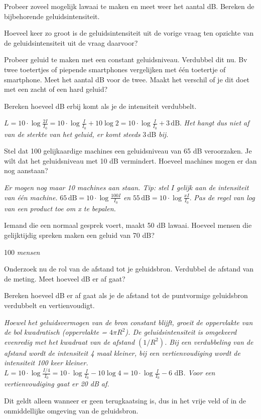 \begin{werktekstoef}
\setcounter{enumi}{13}
\item{Probeer zoveel mogelijk lawaai te maken en meet weer het aantal dB. Bereken de bijbehorende geluidsintensiteit.}

\item{Hoeveel keer zo groot is de geluidsintensiteit uit de vorige vraag ten opzichte van de geluidsintensiteit uit de vraag daarvoor?}

\item{Probeer geluid te maken met een constant geluidsniveau. Verdubbel dit nu. Bv twee toetertjes of piepende smartphones vergelijken met één toetertje of smartphone. Meet het aantal dB voor de twee. Maakt het verschil of je dit doet met een zacht of een hard geluid? }

\item{Bereken hoeveel dB erbij komt als je de intensiteit verdubbelt.}

$L=10\cdot\log\frac{2I}{I_0}=10\cdot\log\frac{I}{I_0}+10\log2=10\cdot\log\frac{I}{I_0}+3\,\textrm{dB}$. \emph{Het hangt dus niet af van de sterkte van het geluid, er komt steeds} 3\,dB \emph{bij.}

\item{Stel dat 100 gelijkaardige machines een geluidsniveau van 65 dB veroorzaken. Je wilt dat het geluidsniveau met 10 dB vermindert. Hoeveel machines mogen er dan nog aanstaan?}

\emph{Er mogen nog maar 10 machines aan staan. Tip: stel $I$ gelijk aan de intensiteit van één machine.} $65\,\textrm{dB}=10\cdot\log\frac{100I}{I_0}$ \emph{en} $55\,\textrm{dB}=10\cdot\log\frac{xI}{I_0}$. \emph{ Pas de regel van \textrm{log} van een product toe om x te bepalen.}

\item {Iemand die een normaal gesprek voert, maakt 50 dB lawaai. Hoeveel mensen die gelijktijdig spreken maken een geluid van 70 dB?}

100 \emph{ mensen}

\item {Onderzoek nu de rol van de afstand tot je geluidsbron. Verdubbel de afstand van de meting. Meet hoeveel dB er af gaat?}

\item {Bereken hoeveel dB er af gaat als je de afstand tot de puntvormige geluidsbron verdubbelt en vertienvoudigt.}

\emph {Hoewel het geluidsvermogen van de bron constant blijft, groeit de oppervlakte van de bol kwadratisch (oppervlakte = $4\pi R^2$). De geluidsintensiteit is omgekeerd evenredig met het kwadraat van de afstand $( 1/R^2)$. Bij een verdubbeling van de afstand wordt de intensiteit 4 maal kleiner, bij een vertienvoudiging wordt de intensiteit 100 keer kleiner. $L=10\cdot\log\frac{I/4}{I_0}=10\cdot\log\frac{I}{I_0}-10\log4=10\cdot\log\frac{I}{I_0}-6 \textrm{ dB}$. Voor een vertienvoudiging gaat er 20  dB af.}
\end{werktekstoef}
Dit geldt alleen wanneer er geen terugkaatsing is, dus in het vrije veld of in de onmiddellijke omgeving van de geluidsbron.


